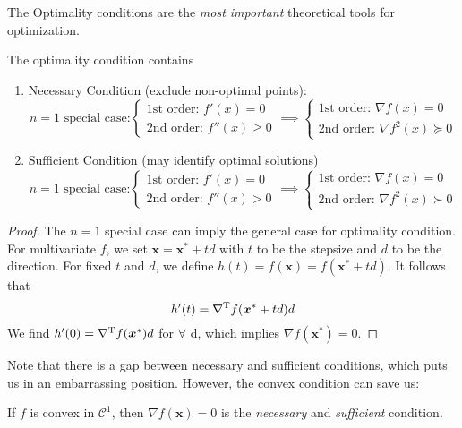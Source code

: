 The Optimality conditions are the \emph{most important} theoretical tools for optimization.
\begin{theorem}The optimality condition contains
\begin{enumerate}
\item
Necessary Condition (exclude non-optimal points):
\[
\mbox{$n=1$ special case:}\left\{
\begin{aligned}
\mbox{1st order: }f'(x)=0\\
\mbox{2nd order: }f''(x)\ge0
\end{aligned}
\right.\implies
\left\{
\begin{aligned}
\mbox{1st order: }\nabla f(x)=0\\
\mbox{2nd order: }\nabla f^2(x)\succeq0
\end{aligned}
\right.
\]
\item
Sufficient Condition (may identify optimal solutions)
\[
\mbox{$n=1$ special case:}\left\{
\begin{aligned}
\mbox{1st order: }f'(x)=0\\
\mbox{2nd order: }f''(x)>0
\end{aligned}
\right.\implies
\left\{
\begin{aligned}
\mbox{1st order: }\nabla f(x)=0\\
\mbox{2nd order: }\nabla f^2(x)\succ0
\end{aligned}
\right.
\]
\end{enumerate}
\end{theorem}
\begin{proof}
The $n=1$ special case can imply the general case for optimality condition. For multivariate $f$, we set $\bm x=\bm x^*+td$ with $t$ to be the stepsize and $d$ to be the direction.  For fixed $t$ and $d$, we define $h(t) = f(\bm x)=f(\bm x^*+td)$. It follows that
\[
h'(t)=\nabla^{\mathrm T} f(\bm x^*+td)d
\]
We find $h'(0)=\nabla^{\mathrm T} f(\bm x^*)d$ for $\forall$ d, which implies $\nabla f(\bm x^*)=0$.
\end{proof}

Note that there is a gap between necessary and sufficient conditions, which puts us in an embarrassing position. However, the convex condition can save us:
\begin{theorem}
If $f$ is convex in $\mathcal{C}^1$, then $\nabla f(\bm x)=0$ is the \emph{necessary} and \emph{sufficient} condition.
\end{theorem}














